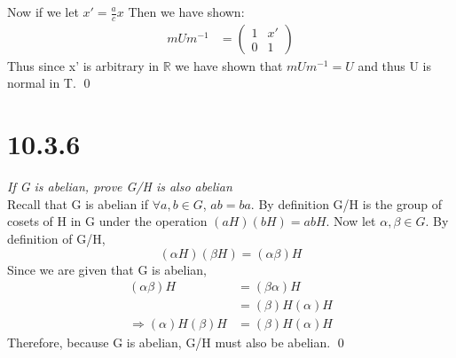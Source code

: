 \documentclass[a4paper, 11pt]{article}
\begin{document}
Now if we let $x' = \frac{a}{c}x$ Then we have shown: 
	\begin{align}
		mUm^{-1} &= \begin{pmatrix}
			1 & x' \\ 
			0 & 1 
		\end{pmatrix}
	\end{align}
Thus since x' is arbitrary in $\mathbb{R}$ we have shown that $mUm^{-1} = U$ and thus U is normal in T. \qed 

\section*{10.3.6}
\textit{If G is abelian, prove G/H is also abelian} \\ 

\noindent Recall that G is abelian if $\forall a,b \in G$, $ab = ba$. By definition G/H is the group of cosets of H in G under the operation $(aH)(bH) = abH$. Now let $\alpha,\beta \in G$. By definition of G/H, 
	\begin{equation*}
		(\alpha H)(\beta H) = (\alpha \beta)H 
	\end{equation*}
Since we are given that G is abelian, 
	\begin{align*}
		(\alpha \beta)H &= (\beta \alpha)H \\ 
						&= (\beta)H(\alpha)H \\
		\Rightarrow (\alpha)H(\beta)H &= (\beta)H(\alpha)H 				
	\end{align*}
Therefore, because G is abelian, G/H must also be abelian.  \qed
\end{document}
